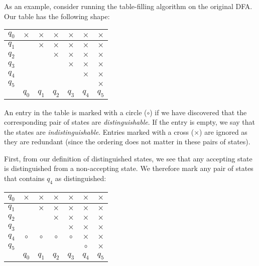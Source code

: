 \documentclass[11pt]{book}
\begin{document}
As an example, consider running the table-filling algorithm on the original DFA.
Our table has the following shape:

\vspace{1em}

\begin{tabular}{|c|c|c|c|c|c|c|}
  \hline
  $q_0$ & $\times$ & $\times$ & $\times$ & $\times$ & $\times$ & $\times$ \\
  \hline
  $q_1$ &          & $\times$ & $\times$ & $\times$ & $\times$ & $\times$ \\
  \hline
  $q_2$ &          &          & $\times$ & $\times$ & $\times$ & $\times$ \\
  \hline
  $q_3$ &          &          &          & $\times$ & $\times$ & $\times$ \\
  \hline
  $q_4$ &          &          &          &          & $\times$ & $\times$ \\
  \hline
  $q_5$ &          &          &          &          &          & $\times$ \\
  \hline
        & $q_0$    & $q_1$    & $q_2$    & $q_3$    & $q_4$    & $q_5$    \\
  \hline
\end{tabular}

\vspace{1em}

An entry in the table is marked with a circle ($\circ$) if we have discovered that the corresponding pair of states are \emph{distinguishable}.
If the entry is empty, we say that the states are \emph{indistinguishable}.
Entries marked with a cross ($\times$) are ignored as they are redundant (since the ordering does not matter in these pairs of states).

First, from our definition of distinguished states, we see that any accepting state is distinguished from a non-accepting state.
We therefore mark any pair of states that contains $q_4$ as distinguished:

\vspace{1em}

\begin{tabular}{|c|c|c|c|c|c|c|}
  \hline
  $q_0$ & $\times$ & $\times$ & $\times$ & $\times$ & $\times$ & $\times$ \\
  \hline
  $q_1$ &          & $\times$ & $\times$ & $\times$ & $\times$ & $\times$ \\
  \hline
  $q_2$ &          &          & $\times$ & $\times$ & $\times$ & $\times$ \\
  \hline
  $q_3$ &          &          &          & $\times$ & $\times$ & $\times$ \\
  \hline
  $q_4$ & $\circ$  & $\circ$  & $\circ$  & $\circ$  & $\times$ & $\times$ \\
  \hline
  $q_5$ &          &          &          &          & $\circ$  & $\times$ \\
  \hline
        & $q_0$    & $q_1$    & $q_2$    & $q_3$    & $q_4$    & $q_5$    \\
  \hline
\end{tabular}
\end{document}
